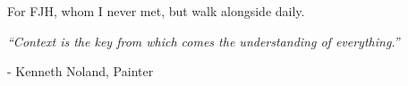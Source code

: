 
\vspace*{\fill}
\begingroup
\begin{center}
{
For FJH, whom I never met, but walk alongside daily.
}
\end{center}
\endgroup
\vspace{1cm}
\begingroup
  {\it
  	``Context is the key from which comes the understanding of everything.''
  }
  \begin{flushright}
    - Kenneth Noland, Painter
  \end{flushright}
\endgroup
\vspace*{\fill}



